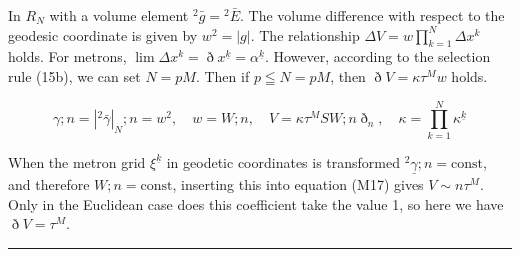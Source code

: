 \documentclass[11pt,a4paper,oneside]{article}
\newcommand{\ethop}{\eth}
\newcommand{\hr}{\par\vspace{2em}\noindent\rule{\linewidth}{0.4pt}\par\vspace{2em}}
\begin{document}
In $R_N$ with a volume element ${}^2 \bar{g} = {}^2 \bar{E}$. The volume difference with respect to the geodesic coordinate is given by $w^2 = | g |$. The relationship $\Delta V = w \prod_{k = 1}^N \Delta x^k$ holds.
For metrons, $\lim \Delta x^k = \ethop x^{\underline {k}} = \alpha^{\underline {k}}$. However, according to the selection rule (15b), we can set $N = pM$. Then if $p \leqq N = pM$, then $\ethop V = \kappa \tau^Mw$ holds.

\begin{equation}
    \gamma; n = | {}^2 \bar{\gamma} |_N; n = w^2,\quad w = W; n,\quad V = \kappa \tau^M SW;n\ethop_n,\quad \kappa = \prod_{k = 1}^N \kappa^{\underline {k}} \tag {M17}
\end{equation}

When the metron grid $\xi^{\underline {k}}$ in geodetic coordinates is transformed ${}^2 \underline {\gamma}; n = \text{const}$, and therefore $W; n = \text{const}$, inserting this into equation (M17) gives $V \sim n \tau^M$. Only in the Euclidean case does this coefficient take the value 1, so here we have $\ethop V = \tau^M$.

\hr
\end{document}
